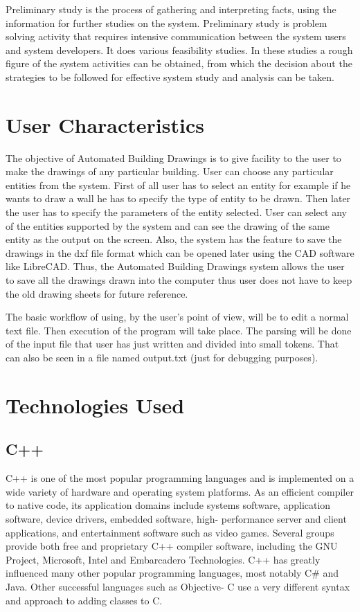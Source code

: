 \noindent Preliminary study is the process of gathering and interpreting facts, using the information for further studies on the system. Preliminary study is problem solving activity that requires intensive communication between the system users and system developers. It does various feasibility studies. In these studies a rough figure of the system activities can be obtained, from which the decision about the strategies to be followed for effective system study and analysis can be taken.

\section{User Characteristics}
The objective of  Automated Building Drawings is to give facility to the user to make the drawings of any particular building. User can choose any particular entities from the system. First of all user has to select an entity for example if he wants to draw a wall he has to specify the type of entity to be drawn. Then later the user has to specify the parameters of the entity selected. User can select any of the entities supported by the system and can see the drawing of the same entity as the output on the screen. Also, the system has the feature to save the drawings in the dxf file format which can be opened later using the CAD software like LibreCAD. Thus, the Automated Building Drawings system allows the user to save all the drawings drawn into the computer thus user does not have to keep the old drawing sheets for future reference.

The basic workflow of using, by the user's point of view, will be to edit a normal text file. Then execution of the program will take place. The parsing will be done of the input file that user has just written and divided into small tokens. That can also be seen in a file named output.txt (just for debugging purposes).

\section{Technologies Used}
\subsection{C++}
\noindent C++ is one of the most popular programming languages and is implemented on a wide variety of hardware and operating system platforms. As an efficient compiler to native code, its application domains include systems software, application software, device drivers, embedded software, high- performance server and client applications, and entertainment software such as video games. Several groups provide both free and proprietary C++ compiler software, including the GNU Project, Microsoft, Intel and Embarcadero Technologies. C++ has greatly influenced many other
popular programming languages, most notably C\# and Java. Other successful languages such as Objective- C use a very different syntax and approach to adding classes to C.\\


